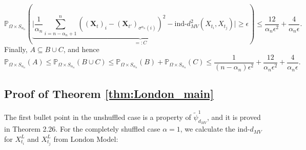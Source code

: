 \documentclass[12pt]{article}
\newcommand{\PP}{\mathbb{P}}
\theoremstyle{definition}
\newcommand{\bX}{\mathbf{X}}
\begin{document}
$$
\PP_{\Omega \times S_{\alpha_n}} \left(  \underbrace{ \bigg| \frac{1}{ \alpha_n}  \sum^{n }_{i = n - \alpha_n +1 } \left( \left( \bX_t \right)_i - (\bX_{t'})_{\sigma^{\alpha_n}(i)} \right)^2  - \text{ind-}d^2_{MV}(X_{t_i}, X_{t_j}) \bigg| \ge \epsilon }_{ = : C} \right)  
\le   \frac{12}{\alpha_n \epsilon^2} + \frac{4}{\alpha_n \epsilon}  .  
$$
Finally, $A \subseteq B \cup C$, and hence 
$$
\PP_{\Omega \times S_{\alpha_n}} (A) \le \PP_{\Omega \times S_{\alpha_n}}( B \cup C) \leq \PP_{\Omega \times S_{\alpha_n}}(B) + \PP_{\Omega \times S_{\alpha_n}}(C) \leq 
\frac{1}{(n-\alpha_n) \epsilon^2} + \frac{12}{\alpha_n \epsilon^2} + \frac{4}{\alpha_n \epsilon}. 
$$




\subsection{Proof of Theorem \ref{thm:London_main}}

The first bullet point in the unshuffled case is a property of $\tilde{\psi}^1_{d_{MV}}$, and it is proved in \cite{chen2024euclidean} Theorem 2.26. 
For the completely shuffled case $\alpha=1$, we calculate the ind-$d_{MV}$ for $X^L_{t_i}$ and $X^L_{t_j}$ from London Model:
\end{document}
